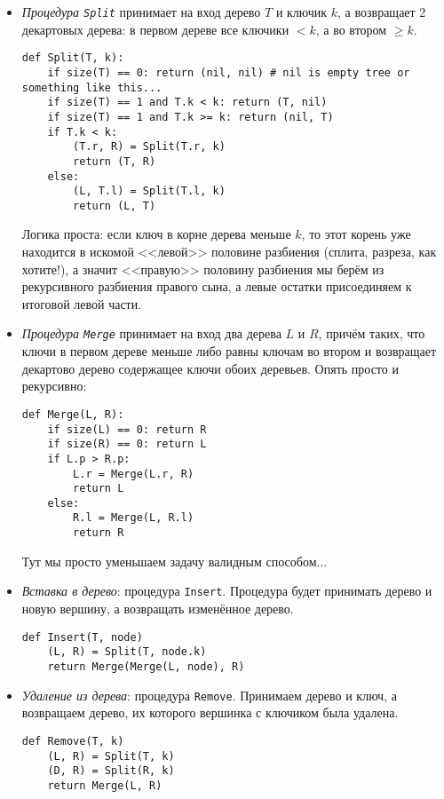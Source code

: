 \begin{itemize}
\item \emph{Процедура \texttt{Split}} принимает на вход дерево $T$ и ключик $k$, а возвращает 2 декартовых дерева: в первом дереве все ключики $< k$, а во втором $\geq k$.
\begin{verbatim}
def Split(T, k):
    if size(T) == 0: return (nil, nil) # nil is empty tree or something like this...
    if size(T) == 1 and T.k < k: return (T, nil)
    if size(T) == 1 and T.k >= k: return (nil, T)
    if T.k < k:
        (T.r, R) = Split(T.r, k)
        return (T, R)
    else:
        (L, T.l) = Split(T.l, k)
        return (L, T)
\end{verbatim}
Логика проста: если ключ в корне дерева меньше $k$, то этот корень уже находится в искомой <<левой>> половине разбиения (сплита, разреза, как хотите!), а значит <<правую>> половину разбиения мы берём из рекурсивного разбиения правого сына, а левые остатки присоединяем к итоговой левой части.

\item \emph{Процедура \texttt{Merge}} принимает на вход два дерева $L$ и $R$, причём таких, что ключи в первом дереве меньше либо равны ключам во втором и возвращает декартово дерево содержащее ключи обоих деревьев. Опять просто и рекурсивно:
\begin{verbatim}
def Merge(L, R):
	if size(L) == 0: return R
	if size(R) == 0: return L
	if L.p > R.p:
	    L.r = Merge(L.r, R)
	    return L
	else:
	    R.l = Merge(L, R.l)
	    return R
\end{verbatim}
Тут мы просто уменьшаем задачу валидным способом...

\item \emph{Вставка в дерево}: процедура \texttt{Insert}. Процедура будет принимать дерево и новую вершину, а возвращать изменённое дерево.
\begin{verbatim}
def Insert(T, node)
	(L, R) = Split(T, node.k)
	return Merge(Merge(L, node), R)
\end{verbatim}

\item \emph{Удаление из дерева}: процедура \texttt{Remove}. Принимаем дерево и ключ, а возвращаем дерево, их которого вершинка с ключиком была удалена.
\begin{verbatim}
def Remove(T, k)
	(L, R) = Split(T, k)
	(D, R) = Split(R, k)
	return Merge(L, R)
\end{verbatim}
\end{itemize}

